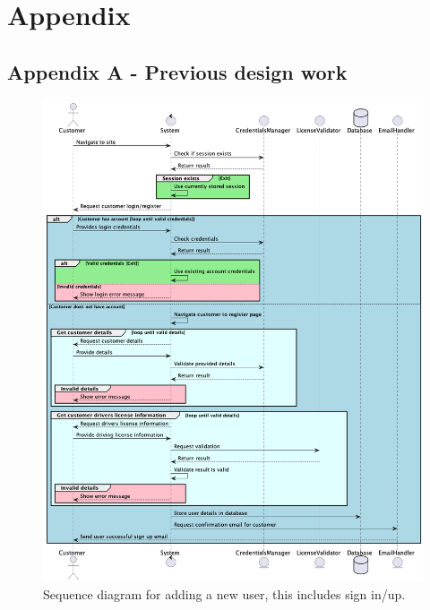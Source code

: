 \section{Appendix}

\label{sec:AppendixA}
\subsection{Appendix A - Previous design work}

  \begin{figure}[H]
    \centering
    \includegraphics[width=12cm]{assets/Sequence1.png}
    \caption{Sequence diagram for adding a new user, this includes sign in/up.}
    \label{fig:newUserSequence}
  \end{figure}

